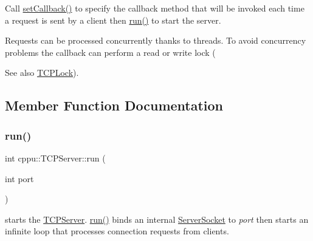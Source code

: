 Call \mbox{\hyperlink{classcppu_1_1_t_c_p_server_a7d4fdb93439015934004755fde72945b}{set\+Callback()}} to specify the callback method that will be invoked each time a request is sent by a client then \mbox{\hyperlink{classcppu_1_1_t_c_p_server_a98e00d62745812b17bdee9f07f2070c4}{run()}} to start the server.

Requests can be processed concurrently thanks to threads. To avoid concurrency problems the callback can perform a read or write lock (\begin{DoxySeeAlso}{See also}
\mbox{\hyperlink{classcppu_1_1_t_c_p_lock}{T\+C\+P\+Lock}}). 
\end{DoxySeeAlso}


\subsection{Member Function Documentation}
\mbox{\label{classcppu_1_1_t_c_p_server_a98e00d62745812b17bdee9f07f2070c4}} 
\subsubsection{\texorpdfstring{run()}{run()}}
{\footnotesize\ttfamily int cppu\+::\+T\+C\+P\+Server\+::run (\begin{DoxyParamCaption}\item[{int}]{port }\end{DoxyParamCaption})\hspace{0.3cm}{\ttfamily [virtual]}}



starts the \mbox{\hyperlink{classcppu_1_1_t_c_p_server}{T\+C\+P\+Server}}. \mbox{\hyperlink{classcppu_1_1_t_c_p_server_a98e00d62745812b17bdee9f07f2070c4}{run()}} binds an internal \mbox{\hyperlink{classcppu_1_1_server_socket}{Server\+Socket}} to {\itshape port} then starts an infinite loop that processes connection requests from clients. 

